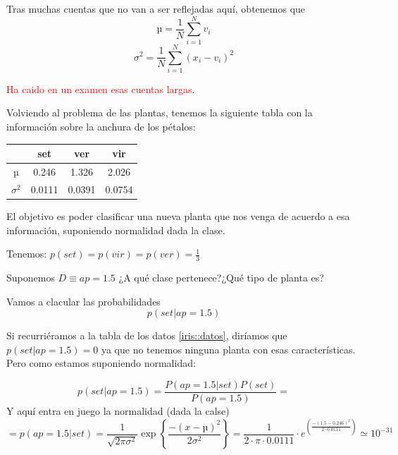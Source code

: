 \documentclass{apuntes}
\begin{document}
Tras muchas cuentas que no van a ser reflejadas aquí, obtenemos que
\[µ = \frac{1}{N}\sum_{i=1}^N v_i\]
\[σ^2 = \frac{1}{N}\sum_{i=1}^N (x_i- v_i)^2\]

 \textcolor{red}{Ha caido en un examen esas cuentas largas}.


Volviendo al problema de las plantas, tenemos la siguiente tabla con la información sobre la anchura de los pétalos:

\begin{center}
\begin{tabular}{c|ccc}
& set & ver & vir \\\hline
µ&0.246&1.326&2.026\\
$σ^2$&0.0111&0.0391&0.0754
\end{tabular}
\end{center}


El objetivo es poder clasificar una nueva planta que nos venga de acuerdo a esa información, suponiendo normalidad dada la clase.

\begin{example}
Tenemos: $p(set) = p(vir) = p(ver) = \frac{1}{3}$

Suponemos $D\equiv ap=1.5$ ¿A qué clase pertenece?¿Qué tipo de planta es?

Vamos  a clacular las probabilidades \[p(set|ap=1.5)\]

Si recurriéramos a la tabla de los datos \ref{iris::datos}, diríamos que $p(set|ap=1.5)=0$ ya que no tenemos ninguna planta con esas características. Pero como estamos suponiendo normalidad:

\[p(set|ap=1.5) = \frac{P(ap=1.5|set)P(set)}{P(ap=1.5)} = \]
Y aquí entra en juego la normalidad (dada la calse)
\[
= p(ap=1.5|set) = \frac{1}{\sqrt{2πσ^2}}\exp\left\{\frac{-(x-µ)^2}{2σ^2} \right\}= \frac{1}{2·π·0.0111}·e^{\left(\frac{-(1.5-0.246)^2}{2·0.0111}\right)} \simeq 10^{-31}
\]

\end{example}
\end{document}
